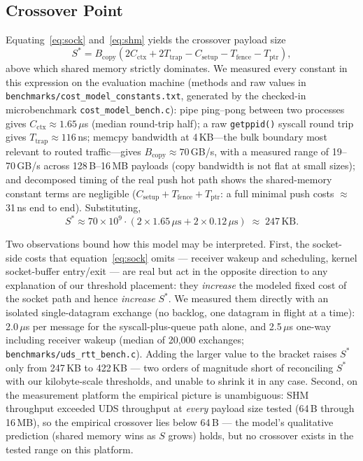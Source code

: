 \documentclass[conference]{IEEEtran}
\begin{document}
\subsection{Crossover Point}
Equating~\eqref{eq:sock} and~\eqref{eq:shm} yields the crossover payload size
\begin{equation}
S^{*} = B_{\mathrm{copy}}\left(2C_{\mathrm{ctx}} + 2T_{\mathrm{trap}}
- C_{\mathrm{setup}} - T_{\mathrm{fence}} - T_{\mathrm{ptr}}\right),
\label{eq:crossover}
\end{equation}
above which shared memory strictly dominates. We measured every constant in
this expression on the evaluation machine (methods and raw values in
\texttt{benchmarks/cost\_model\_constants.txt}, generated by the checked-in
microbenchmark \texttt{cost\_model\_bench.c}): pipe ping--pong between two
processes gives $C_{\mathrm{ctx}} \approx 1.65\,\mu$s (median round-trip
half); a raw \texttt{getppid()} syscall round trip gives
$T_{\mathrm{trap}} \approx 116$\,ns; memcpy bandwidth at 4\,KB---the bulk
boundary most relevant to routed traffic---gives
$B_{\mathrm{copy}} \approx 70$\,GB/s, with a measured range of
19--70\,GB/s across 128\,B--16\,MB payloads (copy bandwidth is not flat at
small sizes); and decomposed timing of the real push hot path shows the
shared-memory constant terms are negligible
($C_{\mathrm{setup}} + T_{\mathrm{fence}} + T_{\mathrm{ptr}}$: a full
minimal push costs $\approx$31\,ns end to end). Substituting,
\begin{equation}
S^{*} \approx 70 \times 10^{9} \cdot
(2 \times 1.65\,\mu\mathrm{s} + 2 \times 0.12\,\mu\mathrm{s})
\;\approx\; 247\,\text{KB}.
\end{equation}

Two observations bound how this model may be interpreted. First, the
socket-side costs that equation~\eqref{eq:sock} omits --- receiver wakeup
and scheduling, kernel socket-buffer entry/exit --- are real but act in the
opposite direction to any explanation of our threshold placement: they
\emph{increase} the modeled fixed cost of the socket path and hence
\emph{increase} $S^{*}$. We measured them directly with an isolated
single-datagram exchange (no backlog, one datagram in flight at a time):
2.0\,$\mu$s per message for the syscall-plus-queue path alone, and
2.5\,$\mu$s one-way including receiver wakeup (median of 20{,}000
exchanges; \texttt{benchmarks/uds\_rtt\_bench.c}). Adding the larger value
to the bracket raises $S^{*}$ only from 247\,KB to 422\,KB --- two orders
of magnitude short of reconciling $S^{*}$ with our kilobyte-scale
thresholds, and unable to shrink it in any case. Second, on the measurement
platform the empirical picture is unambiguous: SHM throughput exceeded UDS
throughput at \emph{every} payload size tested (64\,B through 16\,MB), so
the empirical crossover lies below 64\,B --- the model's qualitative
prediction (shared memory wins as $S$ grows) holds, but no crossover exists
in the tested range on this platform.
\end{document}
